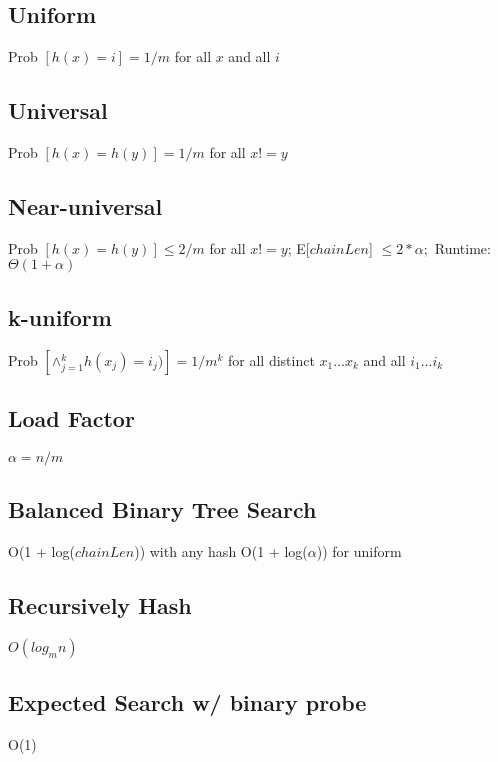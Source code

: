 
\subsection{Uniform}

Prob $[h(x) = i] = 1/m$ for all $x$ and all $i$

\subsection{Universal}
Prob $[h(x) = h(y)] = 1/m$ for all $x != y$
\subsection{Near-universal}
Prob $[h(x) = h(y)] \leq 2/m$ for all $x != y$; E[$chainLen$] $\leq 2*\alpha;$ Runtime: $\Theta(1 + \alpha)$
\subsection{k-uniform}
Prob $ [ \wedge{}_{j=1}^{k} h(x_j) = i_j) ] = 1 / m^{k}$ for all distinct $x_1...x_k$ and all $i_1...i_k$
\subsection{Load Factor}
$\alpha = n/m$
\subsection{Balanced Binary Tree Search}
O(1 + log($chainLen$)) with any hash 
O(1 + log($\alpha$)) for uniform
\subsection{Recursively Hash}
$O(log_{m}{n})$
\subsection{Expected Search w/ binary probe}
O(1)
